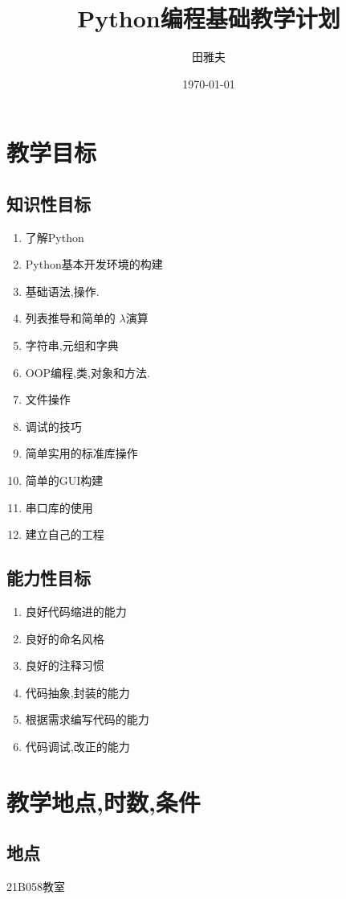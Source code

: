 \documentclass[12pt,a4paper]{article}
\title{Python编程基础教学计划}	%
\author{田雅夫}
\date{\today}
\begin{document}
\maketitle
\section{教学目标}
\subsection{知识性目标}
\begin{enumerate}
\item 了解Python
\item Python基本开发环境的构建
\item 基础语法,操作.
\item 列表推导和简单的 $\lambda$演算
\item 字符串,元组和字典
\item OOP编程,类,对象和方法.
\item 文件操作
\item 调试的技巧
\item 简单实用的标准库操作
\item 简单的GUI构建
\item 串口库的使用
\item 建立自己的工程
\end{enumerate}

\subsection{能力性目标}
\begin{enumerate}
\item 良好代码缩进的能力
\item 良好的命名风格
\item 良好的注释习惯
\item 代码抽象,封装的能力
\item 根据需求编写代码的能力
\item 代码调试,改正的能力

\end{enumerate}

\section{教学地点,时数,条件}
\subsection{地点}
21B058教室
\end{document}
